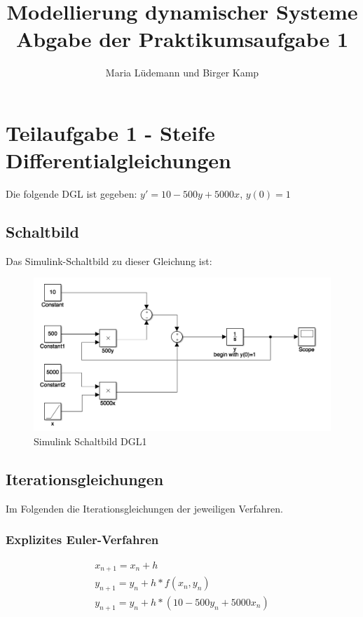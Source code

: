 \documentclass[]{scrartcl}
\title{Modellierung dynamischer Systeme  \\ Abgabe der Praktikumsaufgabe 1}
\author{Maria Lüdemann und Birger Kamp}
\begin{document}
\maketitle

\begin{abstract}

\end{abstract}

\section{Teilaufgabe 1 - Steife Differentialgleichungen}
Die folgende DGL ist gegeben:
$ y' = 10 - 500y + 5000x $,
$ y(0) = 1 $

\subsection*{Schaltbild}
Das Simulink-Schaltbild zu dieser Gleichung ist:

\begin{figure}[htbp]
\centering
\includegraphics[width=0.7\linewidth]{a1_1_Schaltbild}
\caption{Simulink Schaltbild DGL1}
\label{fig:A1_1_Schaltbild}
\end{figure}

\subsection{Iterationsgleichungen}
Im Folgenden die Iterationsgleichungen der jeweiligen Verfahren.

\subsubsection{Explizites Euler-Verfahren}
\begin{align}
x_{n+1} = x_{n}+h \\
y_{n+1} = y_{n}+h*f(x_{n},y_{n}) \\
y_{n+1} = y_{n}+h*(10-500y_{n}+5000x_{n})
\end{align}
\end{document}

